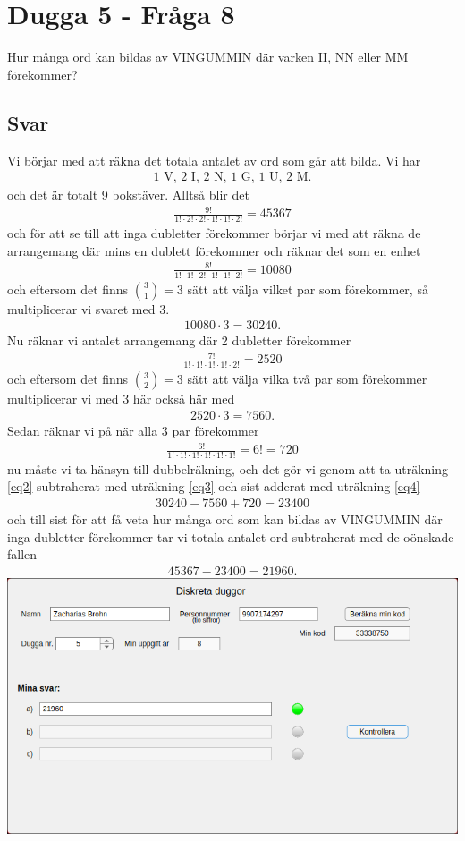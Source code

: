 \documentclass[a4paper,12pt]{article}
\begin{document}
%
\section{Dugga 5 - Fråga 8}
Hur många ord kan bildas av VINGUMMIN där varken II, NN eller MM förekommer?
\subsection*{Svar}
Vi börjar med att räkna det totala antalet av ord som går att bilda. Vi har
\begin{align}
  1 \text{ V, } 2 \text{ I, } 2 \text{ N, } 1 \text{ G, } 1 \text{ U, } 2 \text{ M}.
\end{align}
och det är totalt 9 bokstäver. Alltså blir det
\begin{align}\label{eq1}
    \frac{9!}{1! \cdot 2! \cdot 2! \cdot 1! \cdot 1! \cdot 2!} = 45367
\end{align}
och för att se till att inga dubletter förekommer börjar vi med att räkna de
arrangemang där mins en dublett förekommer och räknar det som en enhet
\begin{align}
    \frac{8!}{1! \cdot 1! \cdot 2! \cdot 1! \cdot 1! \cdot 2!} = 10080
\end{align}
och eftersom det finns $\binom{3}{1} = 3$ sätt att välja vilket par som
förekommer, så multiplicerar vi svaret med $3$.
\begin{align}\label{eq2}
    10080 \cdot 3 = 30240.
\end{align}
Nu räknar vi antalet arrangemang där 2 dubletter förekommer
\begin{align}
    \frac{7!}{1! \cdot 1! \cdot 1! \cdot 1! \cdot 2!} = 2520
\end{align}
och eftersom det finns $\binom{3}{2} = 3$ sätt att välja vilka två par som
förekommer multiplicerar vi med 3 här också
här med
\begin{align}\label{eq3}
    2520 \cdot 3 = 7560.
\end{align}
Sedan räknar vi på när alla 3 par förekommer
\begin{align}\label{eq4}
    \frac{6!}{1! \cdot 1! \cdot 1! \cdot 1! \cdot 1! \cdot 1!} = 6! = 720
\end{align}
nu måste vi ta hänsyn till dubbelräkning, och det gör vi genom att ta uträkning
\ref*{eq2} subtraherat med uträkning \ref*{eq3} och sist adderat med uträkning
\ref*{eq4}
\begin{align}
    30240 - 7560 + 720 = 23400
\end{align}
och till sist för att få veta hur många ord som kan bildas av VINGUMMIN där
inga dubletter förekommer tar vi totala antalet ord subtraherat med de oönskade
fallen
\begin{align}
    45367 - 23400 = 21960.
\end{align}
\includegraphics[width=\textwidth]{RMXBJIG.png}
\end{document}
